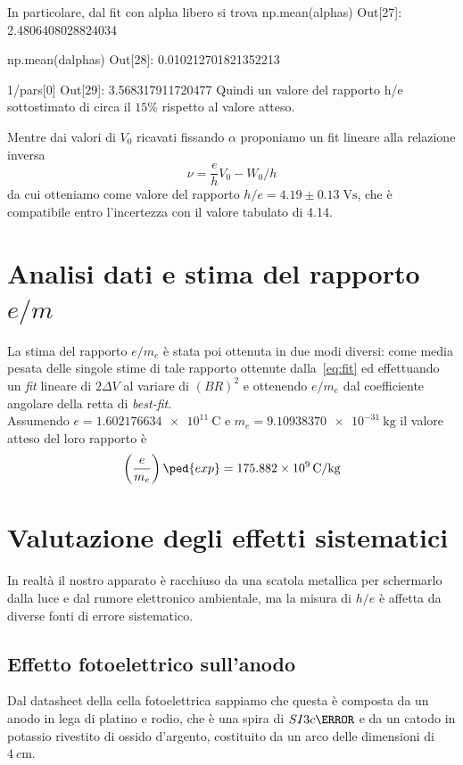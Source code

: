\documentclass[10pt, a4paper, italian]{article}
\begin{document}
In particolare, dal fit con alpha libero si trova
np.mean(alphas)
Out[27]: 2.4806408028824034

np.mean(dalphas)
Out[28]: 0.010212701821352213

1/pars[0]
Out[29]: 3.568317911720477
Quindi un valore del rapporto h/e sottostimato di circa il $15 \%$ rispetto al
valore atteso.

Mentre dai valori di $V_{0}$ ricavati fissando $\alpha$ proponiamo un fit
lineare alla relazione inversa
\begin{equation}
\nu = \frac{e}{h} V_{0} - W_{0}/h
\end{equation}
da cui otteniamo come valore del rapporto $h/e = 4.19 \pm 0.13 \; \si{\V \s}$,
che è compatibile entro l'incertezza con il valore tabulato di 4.14.

\section{Analisi dati e stima del rapporto $e/m$}
La stima del rapporto $ e/m_{e} $ è stata poi ottenuta in due modi diversi: come media pesata delle singole stime di tale rapporto ottenute dalla~\eqref{eq:fit} ed effettuando un \emph{fit} lineare di $ 2\Delta V $ al variare di $ (B R)^{2} $ e ottenendo $ e/m_{e} $ dal coefficiente angolare della retta di \emph{best-fit}. \\
Assumendo $ e = \SI{1.602176634e11}{\coulomb} $ e $ m_{e} = \SI{9.10938370e-31}{\kilogram} $ il valore atteso del loro rapporto è
\begin{equation}\label{eq: e-m-exp}
    \left(\frac{e}{m_{e}}\right)\ped{exp} = \SI[]{ 175.882e9 }{ \coulomb/\kilogram }
\end{equation}

\section{Valutazione degli effetti sistematici}
In realtà il nostro apparato è racchiuso da una scatola metallica per
schermarlo dalla luce e dal rumore elettronico ambientale, ma la misura
di $h/e$ è affetta da diverse fonti di errore sistematico.

\subsection{Effetto fotoelettrico sull'anodo}
Dal datasheet della cella fotoelettrica sappiamo che questa è composta da un
anodo in lega di platino e rodio, che è una spira di $SI{3}{c\meter}$ e da un
catodo in potassio rivestito di ossido d'argento, costituito da un arco
delle dimensioni di $\SI{4}{c\meter}$.
\end{document}
